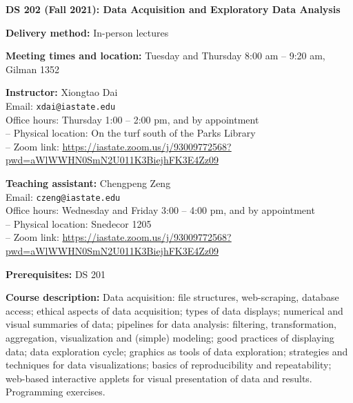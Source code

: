 \documentclass[10pt]{article}
\newcommand{\sep}{\vspace*{0.4cm}}
\newcommand{\tab}{\hspace*{0.8cm}}
\begin{document}

% 
% 

\begin{center}
\textbf{\large DS 202 (Fall 2021): Data Acquisition and Exploratory Data Analysis}
\end{center}
\sep

\textbf{Delivery method:}
In-person lectures
\sep

\textbf{Meeting times and location:}
Tuesday and Thursday 8:00 am -- 9:20 am, Gilman 1352
\sep

\textbf{Instructor:} 
Xiongtao Dai\\
\tab Email: {\tt xdai@iastate.edu}\\
\tab Office hours: Thursday 1:00 -- 2:00 pm, and by appointment\\
\tab \tab -- Physical location: On the turf south of the Parks Library\\
\tab \tab -- Zoom link: \url{https://iastate.zoom.us/j/93009772568?pwd=aWlWWHN0SmN2U011K3BiejhFK3E4Zz09}
\sep

\textbf{Teaching assistant:} 
Chengpeng Zeng \\
\tab Email: {\tt czeng@iastate.edu}\\
\tab Office hours: Wednesday and Friday 3:00 -- 4:00 pm, and by appointment\\
\tab \tab -- Physical location: Snedecor 1205\\
\tab \tab -- Zoom link: \url{https://iastate.zoom.us/j/93009772568?pwd=aWlWWHN0SmN2U011K3BiejhFK3E4Zz09}
\sep

\textbf{Prerequisites:} DS 201
\sep

\textbf{Course description:}
Data acquisition: file structures, web-scraping, database access; ethical aspects of data acquisition; types of data displays; numerical and visual summaries of data; pipelines for data analysis: filtering, transformation, aggregation, visualization and (simple) modeling; good practices of displaying data; data exploration cycle; graphics as tools of data exploration; strategies and techniques for data visualizations; basics of reproducibility and repeatability; web-based interactive applets for visual presentation of data and results. Programming exercises. 
\sep
\end{document}
